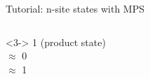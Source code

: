 \begin{frame}[fragile]{Tutorial: n-site states with MPS}
\begin{columns}
\begin{column}{4cm}
\begin{onlyenv}<3->
1 (product state) \\
$\approx$ 0 \\
$\approx$ 1
\end{onlyenv}

\end{column}

\end{columns}

\end{frame}
